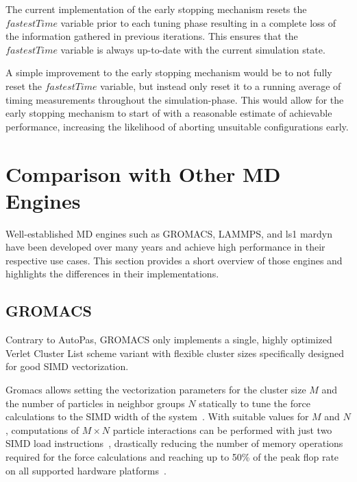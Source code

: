 \documentclass[conference]{IEEEtran}
\begin{document}
\begin{description}[leftmargin=1.2em, font=\itshape]
    \item[Limitations and Future Work:]
        The current implementation of the early stopping mechanism resets the $fastestTime$ variable prior to each tuning phase resulting in a complete loss of the information gathered in previous iterations. This ensures that the $fastestTime$ variable is always up-to-date with the current simulation state.

        A simple improvement to the early stopping mechanism would be to not fully reset the $fastestTime$ variable, but instead only reset it to a running average of timing measurements throughout the simulation-phase. This would allow for the early stopping mechanism to start of with a reasonable estimate of achievable performance, increasing the likelihood of aborting unsuitable configurations early.

\end{description}

\section{Comparison with Other MD Engines}

Well-established MD engines such as GROMACS, LAMMPS, and ls1 mardyn have been developed over many years and achieve high performance in their respective use cases. This section provides a short overview of those engines and highlights the differences in their implementations.

\subsection{GROMACS}

Contrary to AutoPas, GROMACS only implements a single, highly optimized Verlet Cluster List scheme variant with flexible cluster sizes specifically designed for good SIMD vectorization.

Gromacs allows setting the vectorization parameters for the cluster size $M$ and the number of particles in neighbor groups $N$ statically to tune the force calculations to the SIMD width of the system~\cite{PALL20132641}. With suitable values for $M$ and $N$, computations of $M \times N$ particle interactions can be performed with just two SIMD load instructions~\cite{Solving_Software_Challenges_Exascale_2014}, drastically reducing the number of memory operations required for the force calculations and reaching up to 50\% of the peak flop rate on all supported hardware platforms~\cite{Solving_Software_Challenges_Exascale_2014}.
\end{document}

